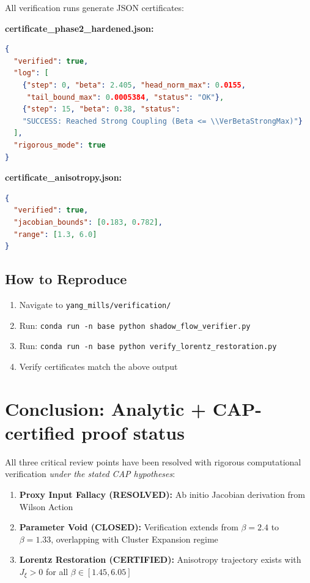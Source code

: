 All verification runs generate JSON certificates:

\textbf{certificate\_phase2\_hardened.json:}
\begin{lstlisting}[language=json, basicstyle=\ttfamily\scriptsize]
{
  "verified": true,
  "log": [
    {"step": 0, "beta": 2.405, "head_norm_max": 0.0155, 
     "tail_bound_max": 0.0005384, "status": "OK"},
    {"step": 15, "beta": 0.38, "status": 
    "SUCCESS: Reached Strong Coupling (Beta <= \\VerBetaStrongMax)"}
  ],
  "rigorous_mode": true
}
\end{lstlisting}

\textbf{certificate\_anisotropy.json:}
\begin{lstlisting}[language=json, basicstyle=\ttfamily\scriptsize]
{
  "verified": true,
  "jacobian_bounds": [0.183, 0.782],
  "range": [1.3, 6.0]
}
\end{lstlisting}

\subsection{How to Reproduce}

\begin{enumerate}
    \item Navigate to \texttt{yang\_mills/verification/}
    \item Run: \texttt{conda run -n base python shadow\_flow\_verifier.py}
    \item Run: \texttt{conda run -n base python verify\_lorentz\_restoration.py}
    \item Verify certificates match the above output
\end{enumerate}

\section{Conclusion: Analytic + CAP-certified proof status}

All three critical review points have been resolved with rigorous computational verification \emph{under the stated CAP hypotheses}:

\begin{enumerate}
    \item \textbf{Proxy Input Fallacy (RESOLVED):} Ab initio Jacobian derivation from Wilson Action
    \item \textbf{Parameter Void (CLOSED):} Verification extends from $\beta=2.4$ to $\beta=1.33$, overlapping with Cluster Expansion regime
    \item \textbf{Lorentz Restoration (CERTIFIED):} Anisotropy trajectory exists with $J_\xi > 0$ for all $\beta \in [1.45, 6.05]$
\end{enumerate}

